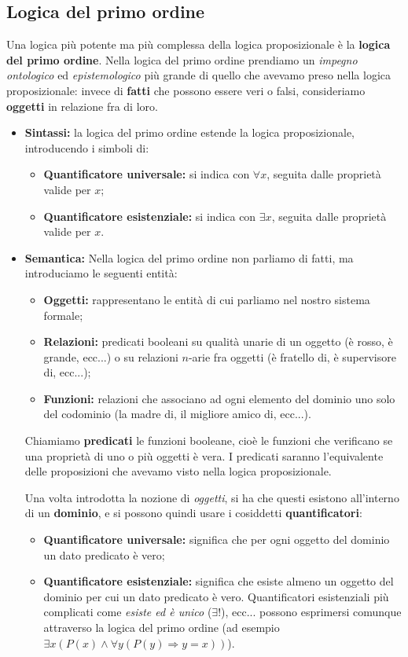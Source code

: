 \documentclass[a4paper,11pt]{article}
\begin{document}
\subsection{Logica del primo ordine}
Una logica più potente ma più complessa della logica proposizionale è la \textbf{logica del primo ordine}.
Nella logica del primo ordine prendiamo un \textit{impegno ontologico} ed \textit{epistemologico} più grande di quello che avevamo preso nella logica proposizionale: invece di \textbf{fatti} che possono essere veri o falsi, consideriamo \textbf{oggetti} in relazione fra di loro.
\begin{itemize}
	\item \textbf{Sintassi:}
		la logica del primo ordine estende la logica proposizionale, introducendo i simboli di:
		\begin{itemize}
			\item \textbf{Quantificatore universale:} si indica con $\forall x$, seguita dalle proprietà valide per $x$;
			\item \textbf{Quantificatore esistenziale:} si indica con $\exists x$, seguita dalle proprietà valide per $x$.
		\end{itemize}
	\item \textbf{Semantica:}
		Nella logica del primo ordine non parliamo di fatti, ma introduciamo le seguenti entità:
		\begin{itemize}
			\item \textbf{Oggetti:} rappresentano le entità di cui parliamo nel nostro sistema formale;
			\item \textbf{Relazioni:} predicati booleani su qualità unarie di un oggetto (è rosso, è grande, ecc...) o su relazioni $n$-arie fra oggetti (è fratello di, è supervisore di, ecc...);
			\item \textbf{Funzioni:} relazioni che associano ad ogni elemento del dominio uno solo del codominio (la madre di, il migliore amico di, ecc...). 
		\end{itemize}
		Chiamiamo \textbf{predicati} le funzioni booleane, cioè le funzioni che verificano se una proprietà di uno o più oggetti è vera. I predicati saranno l'equivalente delle proposizioni che avevamo visto nella logica proposizionale.
		
		Una volta introdotta la nozione di \textit{oggetti}, si ha che questi esistono all'interno di un \textbf{dominio}, e si possono quindi usare i cosiddetti \textbf{quantificatori}:
		\begin{itemize}
			\item \textbf{Quantificatore universale:} significa che per ogni oggetto del dominio un dato predicato è vero;
			\item \textbf{Quantificatore esistenziale:} significa che esiste almeno un oggetto del dominio per cui un dato predicato è vero. Quantificatori esistenziali più complicati come \textit{esiste ed è unico} ($\exists!$), ecc... possono esprimersi comunque attraverso la logica del primo ordine (ad esempio $\exists x ( P(x) \wedge \forall y (P(y) \Rightarrow y = x) )$).
		\end{itemize}
\end{itemize}
\end{document}
